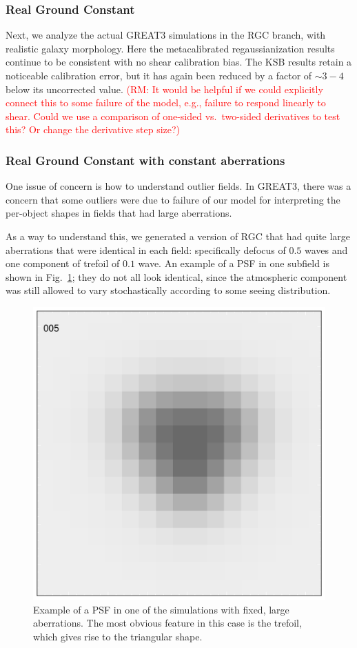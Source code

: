 \documentclass[iop]{emulateapj}
\newcommand\rmcomment[1]{\textcolor{red}{(RM: #1)}}
\begin{document}
\subsubsection{Real Ground Constant}

Next, we analyze the actual GREAT3 simulations in the RGC branch, with
realistic galaxy morphology. Here the metacalibrated regaussianization
results continue to be consistent with no shear calibration bias. The
KSB results retain a noticeable calibration error, but it has again
been reduced by a factor of $\sim3-4$ below its uncorrected value. 
\rmcomment{It would be helpful if we could explicitly connect this to some failure of the model,
  e.g., failure to respond linearly to shear.  Could we use a comparison of one-sided vs.\ two-sided
  derivatives to test this?  Or change the derivative step size?}


\subsubsection{Real Ground Constant with constant aberrations}

One issue of concern is how to understand outlier fields.  In GREAT3,
there was a concern that some outliers were due to failure of our
model for interpreting the per-object shapes in fields that had large
aberrations.

As a way to understand this, we generated a version of RGC that had
quite large aberrations that were identical in each field:
specifically defocus of $0.5$ waves and one component of trefoil of
$0.1$ wave.  An example of a PSF in one subfield is shown in Fig.~\ref{fig:trefoil}; they do not all look
identical, since the atmospheric component was still allowed to vary stochastically according to
some seeing distribution.
\begin{figure}
\begin{center}
\includegraphics[width=0.8\columnwidth]{../Plots/rgc_fixedaber_psf_005.pdf}
\end{center}
\caption{Example of a PSF in one of the simulations with fixed, large aberrations.  The most obvious
feature in this case is the trefoil, which gives rise to the triangular shape. \label{fig:trefoil}}
\end{figure}
\end{document}
